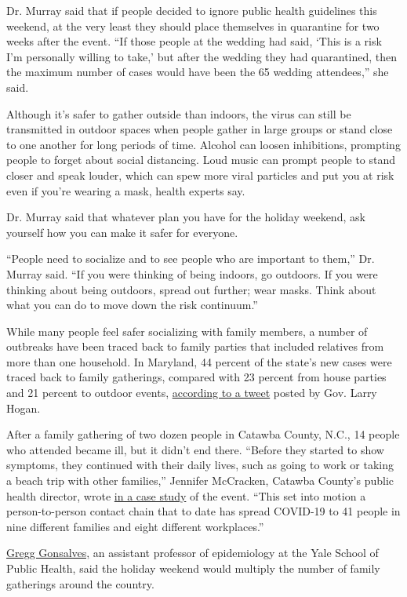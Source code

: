 Dr. Murray said that if people decided to ignore public health
guidelines this weekend, at the very least they should place themselves
in quarantine for two weeks after the event. ``If those people at the
wedding had said, `This is a risk I'm personally willing to take,' but
after the wedding they had quarantined, then the maximum number of cases
would have been the 65 wedding attendees,'' she said.

Although it's safer to gather outside than indoors, the virus can still
be transmitted in outdoor spaces when people gather in large groups or
stand close to one another for long periods of time. Alcohol can loosen
inhibitions, prompting people to forget about social distancing. Loud
music can prompt people to stand closer and speak louder, which can spew
more viral particles and put you at risk even if you're wearing a mask,
health experts say.

Dr. Murray said that whatever plan you have for the holiday weekend, ask
yourself how you can make it safer for everyone.

``People need to socialize and to see people who are important to
them,'' Dr. Murray said. ``If you were thinking of being indoors, go
outdoors. If you were thinking about being outdoors, spread out further;
wear masks. Think about what you can do to move down the risk
continuum.''

While many people feel safer socializing with family members, a number
of outbreaks have been traced back to family parties that included
relatives from more than one household. In Maryland, 44 percent of the
state's new cases were traced back to family gatherings, compared with
23 percent from house parties and 21 percent to outdoor events,
\href{https://twitter.com/GovLarryHogan/status/1289202959830540289}{according
to a tweet} posted by Gov. Larry Hogan.

After a family gathering of two dozen people in Catawba County, N.C., 14
people who attended became ill, but it didn't end there. ``Before they
started to show symptoms, they continued with their daily lives, such as
going to work or taking a beach trip with other families,'' Jennifer
McCracken, Catawba County's public health director, wrote
\href{https://catawbacountync.gov/news/covid-19-in-catawba-county-a-case-study/}{in
a case study} of the event. ``This set into motion a person-to-person
contact chain that to date has spread COVID-19 to 41 people in nine
different families and eight different workplaces.''

\href{https://medicine.yale.edu/profile/gregg_gonsalves/}{Gregg
Gonsalves,} an assistant professor of epidemiology at the Yale School of
Public Health, said the holiday weekend would multiply the number of
family gatherings around the country.


